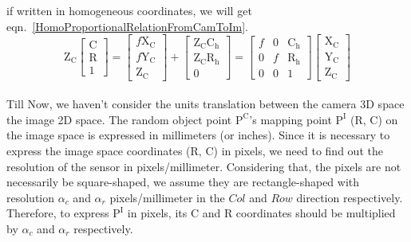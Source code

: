 \noindent
if written in homogeneous coordinates, we will get eqn.~\ref{HomoProportionalRelationFromCamToIm}.
\begin{equation}
%
\text{Z}_\text{C} \left[ \begin{array}{c} \text{C} \\ \text{R} \\ 1 \end{array} \right] %
= %
\left[ \begin{array}{c} f\text{X}_\text{C} \\ f\text{Y}_\text{C} \\ \text{Z}_\text{C} \end{array} \right]%
+
\left[ \begin{array}{c}  \text{Z}_\text{C}\text{C}_\text{h} \\  \text{Z}_\text{C}\text{R}_\text{h} \\ 0\end{array} \right] %
=  \begin{bmatrix} f & 0 &  \text{C}_\text{h}  \\ 0 & f & \text{R}_\text{h} \\ 0 & 0 & 1 \end{bmatrix}%
\left[ \begin{array}{c} \text{X}_\text{C} \\ \text{Y}_\text{C} \\ \text{Z}_\text{C} \end{array} \right]%
\label{HomoProportionalRelationFromCamToIm}
\end{equation}%
%
\\\indent
Till Now, we haven't consider the units translation between the camera 3D space the image 2D space. The random object point \(\text{P}^\text{C}\)'s mapping point \(\text{P}^\text{I}\) (R, C) on the image space is expressed in millimeters (or inches). Since it is necessary to express the image space coordinates (R, C) in pixels, we need to find out the resolution of the sensor in pixels/millimeter. Considering that, the pixels are not necessarily be square-shaped, we assume they are rectangle-shaped with resolution  $\alpha_c$ and \(\alpha_r\) pixels/millimeter in the \(Col\) and \(Row\) direction respectively. Therefore, to express \(\text{P}^\text{I}\) in pixels, its C and R coordinates should be multiplied by \(\alpha_c\) and \(\alpha_r\) respectively.
%
